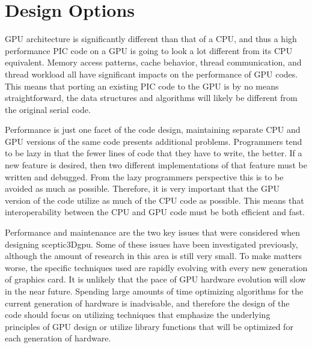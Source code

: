 \chapter{Design Options}
\label{ch:design}

GPU architecture is significantly different than that of a CPU, and thus a high performance PIC code on a GPU is going to look a lot different from its CPU equivalent. Memory access patterns, cache behavior, thread communication, and thread workload all have significant impacts on the performance of GPU codes. This means that porting an existing PIC code to the GPU is by no means straightforward, the data structures and algorithms will likely be different from the original serial code. 

Performance is just one facet of the code design, maintaining separate CPU and GPU versions of the same code presents additional problems. Programmers tend to be lazy in that the fewer lines of code that they have to write, the better. If a new feature is desired, then two different implementations of that feature must be written and debugged. From the lazy programmers perspective this is to be avoided as much as possible. Therefore, it is very important that the GPU version of the code utilize as much of the CPU code as possible. This means that interoperability between the CPU and GPU code must be both efficient and fast. 

Performance and maintenance are the two key issues that were considered when designing sceptic3Dgpu. Some of these issues have been investigated previously, although the amount of research in this area is still very small. To make matters worse, the specific techniques used are rapidly evolving with every new generation of graphics card. It is unlikely that the pace of GPU hardware evolution will slow in the near future. Spending large amounts of time optimizing algorithms for the current generation of hardware is inadvisable, and therefore the design of the code should focus on utilizing techniques that emphasize the underlying principles of GPU design or utilize library functions that will be optimized for each generation of hardware. 

